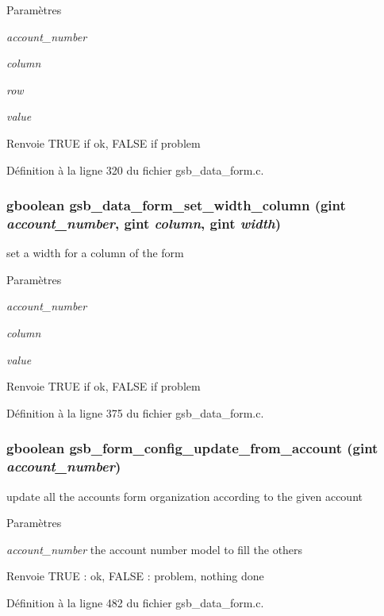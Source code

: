 \begin{DoxyParams}{Paramètres}
\item[{\em account\_\-number}]\item[{\em column}]\item[{\em row}]\item[{\em value}]\end{DoxyParams}
\begin{DoxyReturn}{Renvoie}
TRUE if ok, FALSE if problem 
\end{DoxyReturn}


Définition à la ligne 320 du fichier gsb\_\-data\_\-form.c.

\subsubsection[{gsb\_\-data\_\-form\_\-set\_\-width\_\-column}]{\setlength{\rightskip}{0pt plus 5cm}gboolean gsb\_\-data\_\-form\_\-set\_\-width\_\-column (gint {\em account\_\-number}, \/  gint {\em column}, \/  gint {\em width})}\label{gsb__data__form_8h_a18aec71c64bac7bd9c7da37e05254d3e}
set a width for a column of the form


\begin{DoxyParams}{Paramètres}
\item[{\em account\_\-number}]\item[{\em column}]\item[{\em value}]\end{DoxyParams}
\begin{DoxyReturn}{Renvoie}
TRUE if ok, FALSE if problem 
\end{DoxyReturn}


Définition à la ligne 375 du fichier gsb\_\-data\_\-form.c.

\subsubsection[{gsb\_\-form\_\-config\_\-update\_\-from\_\-account}]{\setlength{\rightskip}{0pt plus 5cm}gboolean gsb\_\-form\_\-config\_\-update\_\-from\_\-account (gint {\em account\_\-number})}\label{gsb__data__form_8h_a206bff690e4524f0bb5c42c1ab55b6a0}
update all the accounts form organization according to the given account


\begin{DoxyParams}{Paramètres}
\item[{\em account\_\-number}]the account number model to fill the others\end{DoxyParams}
\begin{DoxyReturn}{Renvoie}
TRUE : ok, FALSE : problem, nothing done 
\end{DoxyReturn}


Définition à la ligne 482 du fichier gsb\_\-data\_\-form.c.

